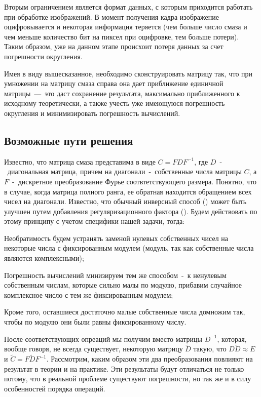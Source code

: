 \documentclass[a4paper]{article}
\theoremstyle{definition}
\newcounter{qcounter}
\begin{document}
    Вторым ограничением является формат данных, с которым приходится работать при обработке изображений. В момент получения кадра изображение оцифровывается и некоторая информация теряется (чем больше число смаза и чем меньше количество бит на пиксел при оцифровке, тем больше потери). Таким образом, уже на данном этапе происхоит потеря данных за счет погрешности округления.


    Имея в виду вышесказанное, необходимо сконструировать матрицу так, что при умножении на матрицу смаза справа она дает приближение единичной матрицы~---~это даст сохранение результата, максимально приближенного к исходному теоретически, а также учесть уже имеющуюся погрешность округления и минимизировать погрешность вычислений.


    \subsection{Возможные пути решения}


    Известно, что матрица смаза представима в виде $C = FDF^{-1}$, где $D$~-~диагональная матрица, причем на диагонали~-~собственные числа матрицы $C$, а $F$~-~дискретное преобразование Фурье соотвтетствующего размера. Понятно, что в случае, когда матрица полного ранга, ее обратная находится обращением всех чисел на диагонали. Известно, что обычный инверсный способ (\cite{model_proc}) может быть улучшен путем добавления регуляризационного фактора (\cite{addition}). Будем действовать по этому принципу с учетом специфики нашей задачи, тогда:


    \begin{list}{)~}{}
        \item Необратимость будем устранять заменой нулевых собственных чисел на некоторые числа с фиксированным модулем (модуль, так как собственные числа являются комплексными);
        \item Погрешность вычислений минизируем тем же способом~-~к ненулевым собственным числам, которые сильно малы по модулю, прибавим случайное комплексное число с тем же фиксированным модулем;
        \item Кроме того, оставшиеся достаточно малые собственные числа домножим так, чтобы по модулю они были равны фиксированному числу.
    \end{list}



    После соответствующих опреаций мы получим вместо матрицы $D^{-1}$, которая, вообще говоря, не всегда существует, некоторую матрицу $\tilde{D}$ такую, что $D\tilde{D} \approx E$ и $\tilde{C} = F\tilde{D}F^{-1}$. Рассмотрим, каким образом эти два преобразования повлияют на результат в теории и на практике. Эти результаты будут отличаться не только потому, что в реальной проблеме существуют погрешности, но так же и в силу особенностей порядка операций.
\end{document}
